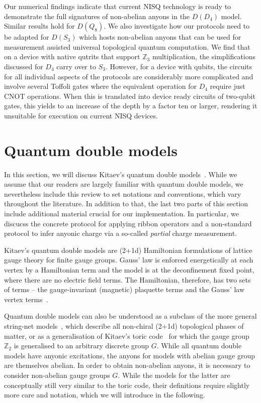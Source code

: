 \documentclass[a4paper,twocolumn,11pt, accepted=2024-06-14]{quantumarticle}
\begin{document}
Our numerical findings indicate that current NISQ technology is ready to demonstrate the full signatures of non-abelian anyons in the $D(D_4)$ model. Similar results hold for $D(Q_8)$. We also investigate how our protocols need to be adapted for $D(S_3)$ which hosts non-abelian anyons that can be used for measurement assisted universal topological quantum computation. We find that on a device with native qutrits that support $\mathbb Z_3$ multiplication, the simplifications discussed for $D_4$ carry over to $S_3$. However, for a device with qubits, the circuits for all individual aspects of the protocols are considerably more complicated and involve several Toffoli gates where the equivalent operation for $D_4$ require just CNOT operations. When this is translated into device ready circuits of two-qubit gates, this yields to an increase of the depth by a factor ten or larger, rendering it unsuitable for execution on current NISQ devices.


\section{Quantum double models}\label{sec:qm_double}
In this section, we will discuss Kitaev's quantum double models~\cite{Kitaev_2003}. While we assume that our readers are largely familiar with quantum double models, we nevertheless include this review to set notations and conventions, which vary throughout the literature. In addition to that, the last two parts of this section include additional material crucial for our implementation. In particular, we discucss the concrete protocol for applying ribbon operators and a non-standard protocol to infer anyonic charge via a so-called \emph{partial} charge measurement. 

Kitaev's quantum double models are (2+1d) Hamiltonian formulations of lattice gauge theory for finite gauge groups. Gauss' law is enforced energetically at each vertex by a Hamiltonian term and the model is at the deconfinement fixed point, where there are no electric field terms.
The Hamiltonian, therefore, has two sets of terms -- the gauge-invariant (magnetic) plaquette terms and the Gauss' law vertex terms~\cite{cui2018topological, Kitaev_2003}. 

Quantum double models can also be understood as a subclass of the more general string-net models~\cite{Levin_2005}, which describe all non-chiral (2+1d) topological phases of matter, or as a generalisation of Kitaev's toric code~\cite{Kitaev_2003} for which the gauge group $\mathbb Z_2$ is generalised to an arbitrary discrete group $G$. While all quantum double models have anyonic excitations, the anyons for models with abelian gauge group are themselves abelian. In order to obtain non-abelian anyons, it is necessary to consider non-abelian gauge groups $G$. While the models for the latter are conceptually still very similar to the toric code, their definitions require slightly more care and notation, which we will introduce in the following. 
\end{document}
